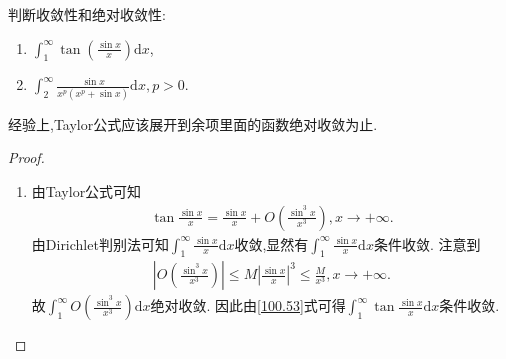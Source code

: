 \documentclass[../../main.tex]{subfiles}
\begin{document}
\begin{example}
判断收敛性和绝对收敛性:
\begin{enumerate}
\item \(\int_{1}^{\infty}\tan\left(\frac{\sin x}{x}\right)\mathrm{d}x\),

\item \(\int_{2}^{\infty}\frac{\sin x}{x^p(x^p + \sin x)}\mathrm{d}x,p > 0\). 
\end{enumerate}
\end{example}
\begin{note}
经验上,Taylor公式应该展开到余项里面的函数绝对收敛为止.
\end{note}
\begin{proof}
\begin{enumerate}
\item 由Taylor公式可知
\begin{align}
\tan\frac{\sin x}{x}=\frac{\sin x}{x}+O\left(\frac{\sin^3 x}{x^3}\right),x\rightarrow +\infty. \label{100.53}
\end{align}
由Dirichlet判别法可知\(\int_{1}^{\infty}\frac{\sin x}{x}\mathrm{d}x\)收敛,显然有\(\int_{1}^{\infty}\frac{\sin x}{x}\mathrm{d}x\)条件收敛. 注意到
\begin{align*}
\left|O\left(\frac{\sin^3 x}{x^3}\right)\right|\leqslant M\left|\frac{\sin x}{x}\right|^3\leqslant\frac{M}{x^3},x\rightarrow +\infty.
\end{align*}
故\(\int_{1}^{\infty}O\left(\frac{\sin^3 x}{x^3}\right)\mathrm{d}x\)绝对收敛. 因此由\eqref{100.53}式可得\(\int_{1}^{\infty}\tan\frac{\sin x}{x}\mathrm{d}x\)条件收敛.


\end{enumerate}
\end{proof}
\end{document}
